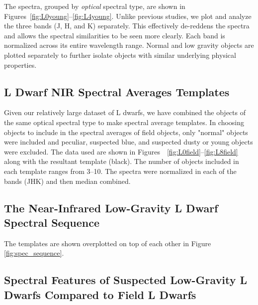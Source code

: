 \documentclass[12pt,preprint]{aastex}
\begin{document}
The spectra, grouped by \emph{optical} spectral type, are shown in Figures~\ref{fig:L0young}--\ref{fig:L4young}. Unlike previous studies, we plot and analyze the three bands (J, H, and K) separately. This effectively de-reddens the spectra and allows the spectral similarities to be seen more clearly. Each band is normalized across its entire wavelength range. Normal and low gravity objects are plotted separately to further isolate objects with similar underlying physical properties.

\subsection{L Dwarf NIR Spectral Averages Templates}
Given our relatively large dataset of L dwarfs, we have combined the objects of the same optical spectral type to make spectral average templates. In choosing objects to include in the spectral averages of field objects, only "normal" objects were included and peculiar, suspected blue, and suspected dusty or young objects were excluded. The data used are shown in  Figures~~\ref{fig:L0field}--\ref{fig:L8field} along with the resultant template (black). The number of objects included in each template ranges from 3--10. The spectra were normalized in each of the bands (JHK) and then median combined. 

\subsection{The Near-Infrared Low-Gravity L Dwarf Spectral Sequence}
The templates are shown overplotted on top of each other in Figure \ref{fig:spec_sequence}. 



\subsection{Spectral Features of Suspected Low-Gravity L Dwarfs Compared to Field L Dwarfs}
\end{document}
